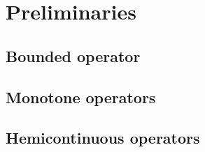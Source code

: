 \documentclass[12pt, a4paper]{book}
\begin{document}
\chapter{Preliminaries }


\section{Bounded operator}
\lipsum[1-12]

\section{Monotone operators}
\lipsum[1-12]
\section{Hemicontinuous operators}
\lipsum[1-12]
\end{document}
